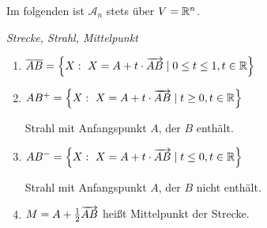 Im folgenden ist $\mathcal{A}_n$ stets über $V = \mathbb{R}^n$.

\begin{mydef}\textit{Strecke, Strahl, Mittelpunkt}
    \begin{enumerate}
        \item $\overline{AB} = \left\{ X:\ X = A + t \cdot \overrightarrow{AB} \mid 0 \leq t \leq 1, t \in \mathbb{R} \right\}$
        \item $AB^+ = \left\{ X:\ X = A + t \cdot \overrightarrow{AB} \mid t \geq 0, t \in \mathbb{R} \right\}$

            Strahl mit Anfangspunkt $A$, der $B$ enthält.
        \item $AB^- = \left\{ X:\ X = A + t \cdot \overrightarrow{AB} \mid t \leq 0, t \in \mathbb{R} \right\}$

            Strahl mit Anfangspunkt $A$, der $B$ nicht enthält.
        \item $M = A + \frac{1}{2} \overrightarrow{AB}$ heißt Mittelpunkt der Strecke.
    \end{enumerate}
\end{mydef}

